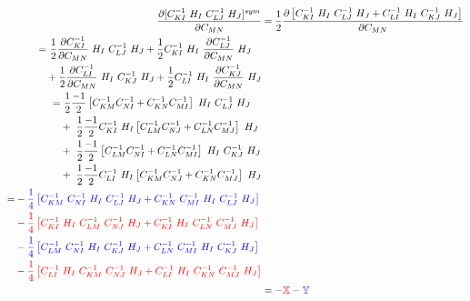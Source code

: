 \begin{align*}
\dfrac{\partial [C^{-1}_{KI} \ H_I \ C^{-1}_{LJ} \ H_J]^{sym}}{\partial C_{MN}} &= \dfrac{1}{2} \dfrac{\partial \left[ C^{-1}_{KI} \ H_I \ C^{-1}_{LJ} \ H_J + C^{-1}_{LI} \ H_I \ C^{-1}_{KJ} \ H_J \right] }{\partial C_{MN}}\\
\begin{split}
= & \ \dfrac{1}{2} \dfrac{\partial C^{-1}_{KI}}{\partial C_{MN}} \ H_I \ C^{-1}_{LJ} \ H_J + \dfrac{1}{2} C^{-1}_{KI} \ H_I \ \dfrac{\partial C^{-1}_{LJ}}{\partial C_{MN}} \ H_J \\
&+ \dfrac{1}{2} \dfrac{\partial C^{-1}_{LI}}{\partial C_{MN}} \ H_I \ C^{-1}_{KJ} \ H_J + \dfrac{1}{2} C^{-1}_{LI} \ H_I \ \dfrac{\partial C^{-1}_{KJ}}{\partial C_{MN}} \ H_J \\
\end{split}\\
\begin{split}
= & \ \dfrac{1}{2} \dfrac{-1}{2} \left[ C^{-1}_{KM} C^{-1}_{NI} + C^{-1}_{KN} C^{-1}_{MI} \right] \ H_I \ C^{-1}_{LJ} \ H_J \\
&+ \ \dfrac{1}{2} \dfrac{-1}{2} C^{-1}_{KI} \ H_I \left[ C^{-1}_{LM} C^{-1}_{NJ} + C^{-1}_{LN} C^{-1}_{MJ} \right] \ H_J \\
&+ \ \dfrac{1}{2} \dfrac{-1}{2} \left[ C^{-1}_{LM} C^{-1}_{NI} + C^{-1}_{LN} C^{-1}_{MI} \right] \ H_I \ C^{-1}_{KJ} \ H_J \\
&+ \ \dfrac{1}{2} \dfrac{-1}{2} C^{-1}_{LI} \ H_I \left[ C^{-1}_{KM} C^{-1}_{NJ} + C^{-1}_{KN} C^{-1}_{MJ} \right] \ H_J \\
\end{split}\\
\begin{split}
= &- \textcolor{blue}{\dfrac{1}{4} \left[ C^{-1}_{KM} \ C^{-1}_{NI} \ H_I \ C^{-1}_{LJ} \ H_J + C^{-1}_{KN} \ C^{-1}_{MI} \ H_I \ C^{-1}_{LJ} \ H_J \right]} \\
&- \textcolor{red}{\dfrac{1}{4} \left[ C^{-1}_{KI} \ H_I \ C^{-1}_{LM} \ C^{-1}_{NJ} \ H_J + C^{-1}_{KI} \ H_I \ C^{-1}_{LN} \ C^{-1}_{MJ} \ H_J \right]} \\
&- \textcolor{blue}{\dfrac{1}{4} \left[ C^{-1}_{LM} \ C^{-1}_{NI} \ H_I \ C^{-1}_{KJ} \ H_J + C^{-1}_{LN} \ C^{-1}_{MI} \ H_I \ C^{-1}_{KJ} \ H_J \right]} \\
&- \textcolor{red}{\dfrac{1}{4} \left[ C^{-1}_{LI} \ H_I \ C^{-1}_{KM} \ C^{-1}_{NJ} \ H_J + C^{-1}_{LI} \ H_I \ C^{-1}_{KN} \ C^{-1}_{MJ} \ H_J \right]}\\
\end{split}\\
&= -\textcolor{red}{\mathbb{X}} - \textcolor{blue}{\mathbb{Y}}
\end{align*}
